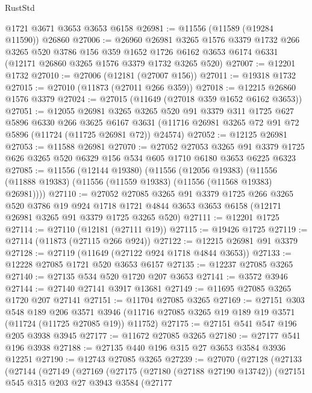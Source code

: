 \begin{lexlean}{RustStd}
\begin{coremodule}
    @1721
    @3671
    @3653
    @3653
    @6158
@26981 := @11556 (@11589 (@19284 @11590)) @26860
@27006 := @26960
    @26981
    @3265
    @1576
    @3379
    @1732
    @266
    @3265
    @520
    @3786
    @156
    @359
    @1652
    @1726
    @6162
    @3653
    @6174
    @6331
    (@12171 @26860 @3265 @1576 @3379 @1732 @3265 @520)
@27007 := @12201 @1732
@27010 := @27006 (@12181 (@27007 @156))
@27011 := @19318 @1732
@27015 := @27010 (@11873 (@27011 @266 @359))
@27018 := @12215 @26860 @1576 @3379
@27024 := @27015 (@11649 (@27018 @359 @1652 @6162 @3653))
@27051 := @12055
    @26981
    @3265
    @3265
    @520
    @91
    @3379
    @311
    @1725
    @627
    @5896
    @6330
    @266
    @3625
    @6167
    @3631
    (@11716 @26981 @3265 @72 @91 @72 @5896 (@11724 (@11725 @26981 @72)) @24574)
@27052 := @12125 @26981
@27053 := @11588 @26981
@27070 := @27052
    @27053
    @3265
    @91
    @3379
    @1725
    @626
    @3265
    @520
    @6329
    @156
    @534
    @605
    @1710
    @6180
    @3653
    @6225
    @6323
@27085 := @11556
    (@12144 @19380)
    (@11556
      (@12056 @19383)
      (@11556 (@11888 @19383) (@11556 (@11559 @19383) (@11556 (@11568 @19383) @26981))))
@27110 := @27052
    @27085
    @3265
    @91
    @3379
    @1725
    @266
    @3265
    @520
    @3786
    @19
    @924
    @1718
    @1721
    @4844
    @3653
    @3653
    @6158
    (@12171 @26981 @3265 @91 @3379 @1725 @3265 @520)
@27111 := @12201 @1725
@27114 := @27110 (@12181 (@27111 @19))
@27115 := @19426 @1725
@27119 := @27114 (@11873 (@27115 @266 @924))
@27122 := @12215 @26981 @91 @3379
@27128 := @27119 (@11649 (@27122 @924 @1718 @4844 @3653))
@27133 := @12228 @27085 @1721 @520 @3653 @6157
@27135 := @12237 @27085 @3265
@27140 := @27135 @534 @520 @1720 @207 @3653
@27141 := @3572 @3946
@27144 := @27140 @27141 @3917 @13681
@27149 := @11695 @27085 @3265 @1720 @207 @27141
@27151 := @11704 @27085 @3265
@27169 := @27151
    @303
    @548
    @189
    @206
    @3571
    @3946
    (@11716 @27085 @3265 @19 @189 @19 @3571 (@11724 (@11725 @27085 @19)) @11752)
@27175 := @27151 @541 @547 @196 @205 @3938 @3945
@27177 := @11672 @27085 @3265
@27180 := @27177 @541 @196 @3938
@27188 := @27135 @440 @196 @315 @27 @3653 @3584 @3936 @12251
@27190 := @12743 @27085 @3265
@27239 := @27070
    (@27128
      (@27133
        (@27144
          (@27149
            (@27169
              (@27175
                (@27180 (@27188 @27190 @13742))
                (@27151
                  @545
                  @315
                  @203
                  @27
                  @3943
                  @3584
                  (@27177

\end{coremodule}
\end{lexlean}
